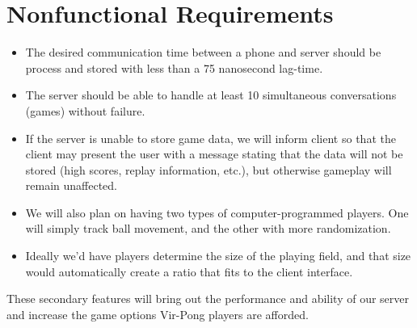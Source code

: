 \documentclass[letterpaper,12pt]{article}
\begin{document}
\section{Nonfunctional Requirements}
\begin{itemize}
\item The desired communication time between a phone and server should be process and stored with less than a 75 nanosecond lag-time.
\item The server should be able to handle at least 10 simultaneous conversations (games) without failure. 
\item If the server is unable to store game data, we will inform client so that the client may present the user with a message stating that the data will not be stored (high scores, replay information, etc.), but otherwise gameplay will remain unaffected. 
\item We will also plan on having two types of computer-programmed players. One will simply track ball movement, and the other with more randomization. 
\item Ideally we'd have players determine the size of the playing field, and that size would automatically create a ratio that fits to the client interface. 
\end{itemize}
These secondary features will bring out the performance and ability of our server and increase the game options Vir-Pong players are afforded. 
\end{document}
